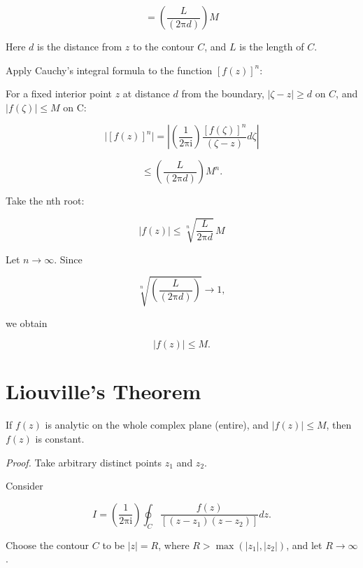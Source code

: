 \documentclass[11pt,a4paper]{article}
\theoremstyle{definition}
\theoremstyle{plain}
\begin{document}
\[
= \left(\frac{L}{(2\mathrm{\pi}d)}\right)M
\]

Here $d$ is the distance from $z$ to the contour $C$, and $L$ is the length of $C$.

Apply Cauchy’s integral formula to the function $[f(z)]^{n}$:

For a fixed interior point $z$ at distance $d$ from the boundary, $\vert{}\zeta - z\vert{} \ge d$ on $C$, and $\vert{}f(\zeta)\vert{} \le M$ on C:

\begin{equation}
\vert{}[f(z)]^{n}\vert{} = \left\vert{}\left(\frac{1}{2\mathrm{\pi}\mathrm{i}}\right)\frac{[f(\zeta)]^{n}}{(\zeta - z)}d\zeta\right\vert{}
\end{equation}

\[
\le \left(\frac{L}{(2\mathrm{\pi}d)}\right)M^{n}.
\]

Take the nth root:

\begin{equation}
\vert{}f(z)\vert{} \le \sqrt[n]{\frac{L}{2\mathrm{\pi}d}}\,M
\end{equation}

Let $n \to \infty$. Since

\begin{equation}
\sqrt[n]{\left(\frac{L}{(2\mathrm{\pi}d)}\right)} \to 1,
\end{equation}

we obtain

\begin{equation}
\vert{}f(z)\vert{} \le M.
\end{equation}

\section{Liouville's Theorem}

If $f(z)$ is analytic on the whole complex plane (entire), and $\vert{}f(z)\vert{} \le M$, then $f(z)$ is constant.

\textit{Proof.} Take arbitrary distinct points $z_{1}$ and $z_{2}$.

Consider

\begin{equation}
I = \left(\frac{1}{2\mathrm{\pi}\mathrm{i}}\right)\oint_{C}\frac{f(z)}{[(z - z_{1})(z - z_{2})]}dz.
\end{equation}

Choose the contour $C$ to be $\vert{}z\vert{} = R$, where $R > \max(\vert{}z_{1}\vert{}, \vert{}z_{2}\vert{})$, and let $R \to \infty$.
\end{document}
